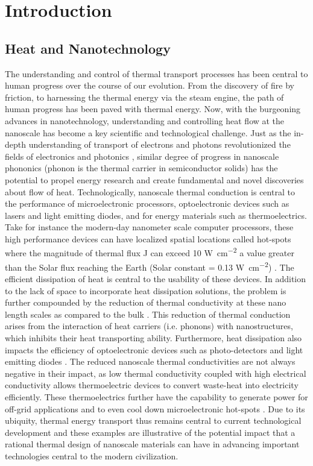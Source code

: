 \chapter{Introduction}
\label{chap:intro}

\section{Heat and Nanotechnology}

The understanding and control of thermal transport processes has been central to human progress over the course of our evolution. From the discovery of fire by friction, to harnessing the thermal energy via the steam engine, the path of human progress has been paved with thermal energy. Now, with the burgeoning advances in nanotechnology, understanding and controlling heat flow at the nanoscale has become a key scientific and technological challenge. Just as the in-depth understanding of transport of electrons and photons revolutionized the fields of electronics and photonics \cite{RN486,book_maldovan}, similar degree of progress in nanoscale phononics (phonon is the thermal carrier in semiconductor solids) has the potential to propel energy research and create fundamental and novel discoveries about flow of heat. Technologically, nanoscale thermal conduction is central to the performance of microelectronic processors, optoelectronic devices such as lasers and light emitting diodes, and for energy materials such as thermoelectrics. Take for instance the modern-day nanometer scale computer processors, these high performance devices can have localized spatial locations called hot-spots where the magnitude of thermal flux \gls{J} can exceed 10 \si{\watt\per\centi\meter\squared} \cite{rev_Majum_thermoelec,rev_Moore} a value greater than the Solar flux reaching the Earth (Solar constant = 0.13 \si{\watt\per\centi\meter\squared}) \cite{solarconstant}. The efficient dissipation of heat is central to the usability of these devices. In addition to the lack of space to incorporate heat dissipation solutions, the problem is further compounded by the reduction of thermal conductivity at these nano length scales as compared to the bulk \cite{book_Zhuomin}. This reduction of thermal conduction arises from the interaction of heat carriers (i.e. phonons) with nanostructures, which inhibits their heat transporting ability. Furthermore, heat dissipation also impacts the efficiency of optoelectronic devices such as photo-detectors and light emitting diodes \cite{book_rogalski_infrared}. The reduced nanoscale thermal conductivities are not always negative in their impact, as low thermal conductivity coupled with high electrical conductivity allows thermoelectric devices to convert waste-heat into electricity efficiently. These thermoelectrics further have the capability to generate power for off-grid applications and to even cool down microelectronic hot-spots \cite{rev_snyder,rev_thermoelec_tritt,rev_Majum_thermoelec}. Due to its ubiquity, thermal energy transport thus remains central to current technological development and these examples are illustrative of the potential impact that a rational thermal design of nanoscale materials can have in advancing important technologies central to the modern civilization.

